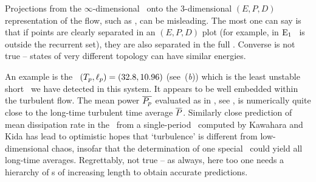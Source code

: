 Projections from the $\infty$-dimensional \statesp\ onto the 3-dimensional
$(E,P,D)$ representation of the flow, such as
, can be misleading.
The most one can say is that if points are clearly separated in an
$(E,P,D)$ plot (for example, in 
$\mathrm{E}_{1}$ \eqv\ is outside the recurrent set), they are also separated
in the full \statesp.  Converse is not true -- states of
very different topology can have similar energies.

An example is
the \rpo\ $({T_{p}},\ell_p) = (32.8,10.96)$
(see \,(\textit{b})) which is the least
unstable short \rpo\ we have detected in this system. It appears to be
well embedded within the turbulent flow. The mean power $\overline{P_p}$ evaluated
as in , see ,
is numerically quite close to the long-time
turbulent time average $\overline{P}$.
Similarly close prediction of mean dissipation rate in the
\pCf\ from a single-period \po\ computed by
Kawahara and Kida has lead to
optimistic hopes that `turbulence' is different from
low-dimensional chaos, insofar that the determination of one special
\po\ could yield all long-time averages.
Regrettably, not true -- as always, here too one needs a hierarchy
of \po s of increasing length to obtain accurate
predictions.

